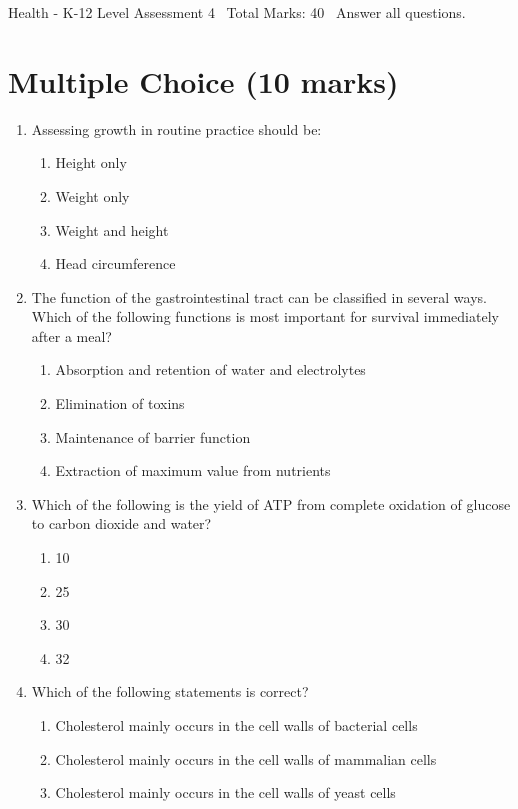 \documentclass[12pt]{article}
\begin{document}
\begin{center}
Health - K-12 Level Assessment 4 \
Total Marks: 40 \
Answer all questions.
\end{center}

\section*{Multiple Choice (10 marks)}
\begin{enumerate}[label=\arabic*.]
\item Assessing growth in routine practice should be:
\begin{enumerate}[label=(\alph*)]
    \item Height only
    \item Weight only
    \item Weight and height
    \item Head circumference
\end{enumerate}
\item The function of the gastrointestinal tract can be classified in several ways. Which of the
following functions is most important for survival immediately after a meal?
\begin{enumerate}[label=(\alph*)]
    \item Absorption and retention of water and electrolytes
    \item Elimination of toxins
    \item Maintenance of barrier function
    \item Extraction of maximum value from nutrients
\end{enumerate}
\item Which of the following is the yield of ATP from complete oxidation of glucose to carbon
dioxide and water?
\begin{enumerate}[label=(\alph*)]
    \item 10
    \item 25
    \item 30
    \item 32
\end{enumerate}
\item Which of the following statements is correct?
\begin{enumerate}[label=(\alph*)]
    \item Cholesterol mainly occurs in the cell walls of bacterial cells
    \item Cholesterol mainly occurs in the cell walls of mammalian cells
    \item Cholesterol mainly occurs in the cell walls of yeast cells

\end{enumerate}
\end{enumerate}
\end{document}
